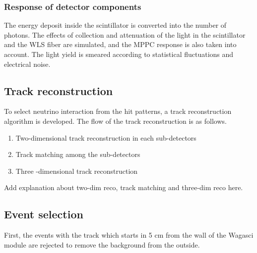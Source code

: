 \subsubsection{Response of detector components}
The energy deposit inside the scintillator is converted into the number of photons. 
The effects of collection and attenuation of the light in the scintillator and the WLS fiber are simulated, and the MPPC response is also taken into account. 
The light yield is smeared according to statistical fluctuations and electrical noise.


\subsection{Track reconstruction}
To select neutrino interaction from the hit patterns, a track reconstruction algorithm is developed.
The flow of the track reconstruction is as follows.
\begin{enumerate}
\item Two-dimensional track reconstruction in each sub-detectors
\item Track matching among the sub-detectors
\item Three -dimensional track reconstruction
\end{enumerate}

Add explanation about two-dim reco, track matching and three-dim reco here.


\subsection{Event selection}

First, the events with the track which starts in 5 cm from the wall of the Wagasci module are rejected to remove the background from the outside.


